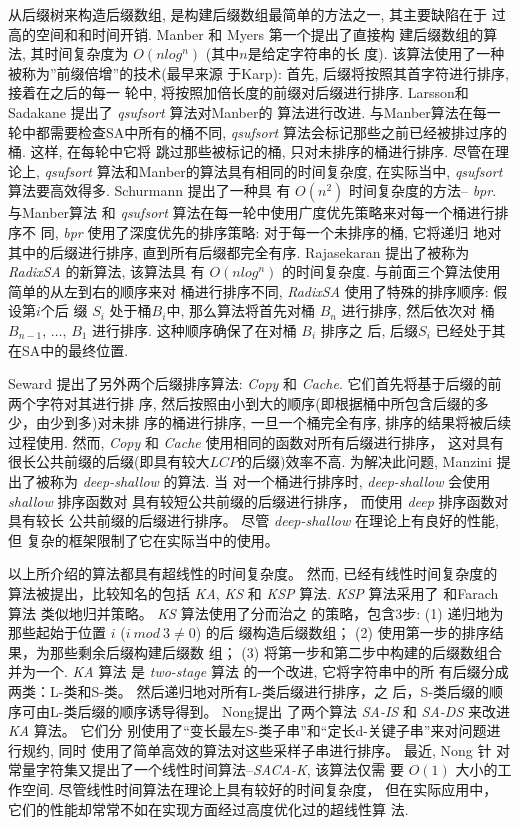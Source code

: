 \documentclass{ws-ijprai}
\begin{document}
从后缀树来构造后缀数组, 是构建后缀数组最简单的方法之一, 其主要缺陷在于
过高的空间和和时间开销. Manber 和 Myers\cite{Manber} 第一个提出了直接构
建后缀数组的算法, 其时间复杂度为 $O(nlog^n)$ (其中$n$是给定字符串的长
度). 该算法使用了一种被称为''前缀倍增''的技术(最早来源
于Karp\cite{Karp}): 首先, 后缀将按照其首字符进行排序, 接着在之后的每一
轮中, 将按照加倍长度的前缀对后缀进行排序.
Larsson和Sadakane\cite{qsufsort} 提出了 \emph{qsufsort} 算法对Manber的
算法进行改进. 与Manber算法在每一轮中都需要检查SA中所有的桶不同,
\emph{qsufsort} 算法会标记那些之前已经被排过序的桶. 这样, 在每轮中它将
跳过那些被标记的桶, 只对未排序的桶进行排序. 尽管在理论上,
\emph{qsufsort} 算法和Manber的算法具有相同的时间复杂度, 在实际当中,
\emph{qsufsort}算法要高效得多. Schurmann\cite{bpr} 提出了一种具
有 $O(n^2)$ 时间复杂度的方法-- \emph{bpr}. 与Manber算法
和 \emph{qsufsort} 算法在每一轮中使用广度优先策略来对每一个桶进行排序不
同, \emph{bpr} 使用了深度优先的排序策略: 对于每一个未排序的桶, 它将递归
地对其中的后缀进行排序, 直到所有后缀都完全有序.  Rajasekaran
\cite{RadixSA} 提出了被称为 \emph{RadixSA} 的新算法, 该算法具
有 $O(nlog^n)$ 的时间复杂度. 与前面三个算法使用简单的从左到右的顺序来对
桶进行排序不同, \emph{RadixSA} 使用了特殊的排序顺序: 假设第$i$个后
缀 $S_i$ 处于桶$B_i$中, 那么算法将首先对桶 $B_n$ 进行排序, 然后依次对
桶 $B_{n-1},\,\dots,\, B_1$ 进行排序. 这种顺序确保了在对桶 $B_i$ 排序之
后, 后缀$S_i$ 已经处于其在SA中的最终位置.

Seward\cite{Copy_Cache} 提出了另外两个后缀排序算法:
\emph{Copy} 和 \emph{Cache}. 它们首先将基于后缀的前两个字符对其进行排
序, 然后按照由小到大的顺序(即根据桶中所包含后缀的多少，由少到多)对未排
序的桶进行排序, 一旦一个桶完全有序, 排序的结果将被后续过程使用. 然而,
\emph{Copy} 和 \emph{Cache} 使用相同的函数对所有后缀进行排序， 这对具有
很长公共前缀的后缀(即具有较大$LCP$的后缀)效率不高. 为解决此问题,
Manzini\cite{deep_shallow} 提出了被称为 \emph{deep-shallow} 的算法. 当
对一个桶进行排序时, \emph{deep-shallow} 会使用\emph{shallow} 排序函数对
具有较短公共前缀的后缀进行排序， 而使用 \emph{deep} 排序函数对具有较长
公共前缀的后缀进行排序。 尽管 \emph{deep-shallow} 在理论上有良好的性能,但
复杂的框架限制了它在实际当中的使用。

以上所介绍的算法都具有超线性的时间复杂度。 然而, 已经有线性时间复杂度的
算法被提出，比较知名的包括 \emph{KA}\cite{KA},
\emph{KS}\cite{KS} 和 \emph{KSP}\cite{KSP} 算法. \emph{KSP} 算法采用了
和Farach算法\cite{Farach} 类似地归并策略。 \emph{KS} 算法使用了分而治之
的策略，包含3步: (1) 递归地为那些起始于位置 $i$ ($i~mod~3 \neq 0$) 的后
缀构造后缀数组； (2) 使用第一步的排序结果，为那些剩余后缀构建后缀数
组； (3) 将第一步和第二步中构建的后缀数组合并为一个. \emph{KA} 算法
是 \emph{two-stage} 算法\cite{two_stages} 的一个改进, 它将字符串中的所
有后缀分成两类：L-类和S-类。 然后递归地对所有L-类后缀进行排序，之
后，S-类后缀的顺序可由L-类后缀的顺序诱导得到。 Nong\cite{SA_IS_DS}提出
了两个算法 \emph{SA-IS} 和 \emph{SA-DS} 来改进 \emph{KA} 算法。 它们分
别使用了“变长最左S-类子串”和“定长d-关键子串”来对问题进行规约, 同时
使用了简单高效的算法对这些采样子串进行排序。 最近, Nong\cite{SACA_K} 针
对常量字符集又提出了一个线性时间算法--\emph{SACA-K}, 该算法仅需
要 $O(1)$ 大小的工作空间. 尽管线性时间算法在理论上具有较好的时间复杂度，
但在实际应用中， 它们的性能却常常不如在实现方面经过高度优化过的超线性算
法\cite{RadixSA}.
\end{document}

